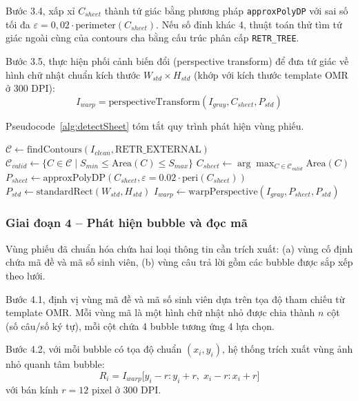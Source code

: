 ﻿\documentclass[../DoAn.tex]{subfiles}
\begin{document}
Bước 3.4, xấp xỉ $C_{sheet}$ thành tứ giác bằng phương pháp \texttt{approxPolyDP} với sai số tối đa $\varepsilon = 0{,}02 \cdot \text{perimeter}(C_{sheet})$. Nếu số đỉnh khác 4, thuật toán thử tìm tứ giác ngoài cùng của contours cha bằng cấu trúc phân cấp \texttt{RETR\_TREE}.

Bước 3.5, thực hiện phối cảnh biến đổi (perspective transform) để đưa tứ giác về hình chữ nhật chuẩn kích thước $W_{std} \times H_{std}$ (khớp với kích thước template OMR ở 300 DPI):
\begin{equation}
    I_{warp} = \text{perspectiveTransform}(I_{gray}, C_{sheet}, P_{std})
\end{equation}

Pseudocode~\ref{alg:detectSheet} tóm tắt quy trình phát hiện vùng phiếu.

\begin{algorithm}[H]
\caption{Phát hiện vùng phiếu trả lời}
\label{alg:detectSheet}
\SetAlgoLined
{}
 $\mathcal{C} \gets \text{findContours}(I_{clean}, \text{RETR\_EXTERNAL})$ \;
 $\mathcal{C}_{valid} \gets \{ C \in \mathcal{C} \mid S_{min} \le \text{Area}(C) \le S_{max} \}$ \;
 $C_{sheet} \gets \arg\max_{C \in \mathcal{C}_{valid}} \text{Area}(C)$ \;
 $P_{sheet} \gets \text{approxPolyDP}(C_{sheet}, \varepsilon=0.02 \cdot \text{peri}(C_{sheet}))$ \;
 $P_{std} \gets \text{standardRect}(W_{std}, H_{std})$ \;
 $I_{warp} \gets \text{warpPerspective}(I_{gray}, P_{sheet}, P_{std})$ \;
  \;
\end{algorithm}

\subsubsection{Giai đoạn 4 -- Phát hiện bubble và đọc mã}
Vùng phiếu đã chuẩn hóa chứa hai loại thông tin cần trích xuất: (a) vùng cố định chứa mã đề và mã số sinh viên, (b) vùng câu trả lời gồm các bubble được sắp xếp theo lưới.

Bước 4.1, định vị vùng mã đề và mã số sinh viên dựa trên tọa độ tham chiếu từ template OMR. Mỗi vùng mã là một hình chữ nhật nhỏ được chia thành $n$ cột (số câu/số ký tự), mỗi cột chứa 4 bubble tương ứng 4 lựa chọn.

Bước 4.2, với mỗi bubble có tọa độ chuẩn $(x_i, y_i)$, hệ thống trích xuất vùng ảnh nhỏ quanh tâm bubble:
\begin{equation}
    R_i = I_{warp}\bigl[y_i - r : y_i + r,\; x_i - r : x_i + r\bigr]
\end{equation}
với bán kính $r = 12$ pixel ở 300 DPI.
\end{document}
